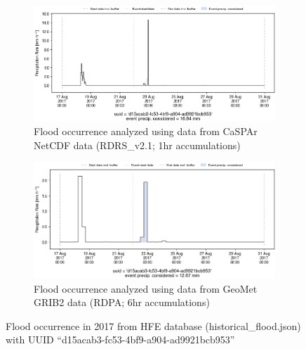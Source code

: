 \documentclass[10pt,a4paper,titlepage,parskip]{scrartcl}
\begin{document}
\begin{figure}[h]
	\begin{subfigure}[a]{1.0\textwidth}
		\centering
		\includegraphics[width=\linewidth]{figures/compare_Geomet_CaSPAr/interpolated_at_stations_occurrence_1009_identified-timesteps_RDRS_v2.1.png}
		\caption{Flood occurrence analyzed using data from CaSPAr NetCDF data (RDRS\_v2.1; 1hr accumulations)}
	\end{subfigure}
	\par\bigskip\bigskip
	\begin{subfigure}[b]{1.0\textwidth}
		\centering
		\includegraphics[width=\linewidth]{figures/compare_Geomet_CaSPAr/interpolated_at_stations_occurrence_1009_identified-timesteps_rdpa:10km:6f.png}
		\caption{Flood occurrence analyzed using data from GeoMet GRIB2 data (RDPA; 6hr accumulations)}
	\end{subfigure}
	\par\bigskip\bigskip
	\caption{Flood occurrence in 2017 from HFE database (historical\_flood.json) with UUID ``d15acab3-fc53-4bf9-a904-ad9921bcb953''}
\end{figure}
\pagebreak
\end{document}
